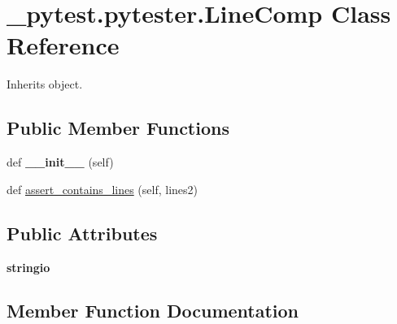 \hypertarget{class__pytest_1_1pytester_1_1_line_comp}{}\section{\+\_\+pytest.\+pytester.\+Line\+Comp Class Reference}
\label{class__pytest_1_1pytester_1_1_line_comp}


Inherits object.

\subsection*{Public Member Functions}
\begin{DoxyCompactItemize}
\item 
\mbox{\label{class__pytest_1_1pytester_1_1_line_comp_afca557bc4922ba67c3971ec4f550e587}} 
def {\bfseries \+\_\+\+\_\+init\+\_\+\+\_\+} (self)
\item 
def \hyperlink{class__pytest_1_1pytester_1_1_line_comp_a323d8292ed0ec82721e0654859929202}{assert\+\_\+contains\+\_\+lines} (self, lines2)
\end{DoxyCompactItemize}
\subsection*{Public Attributes}
\begin{DoxyCompactItemize}
\item 
\mbox{\label{class__pytest_1_1pytester_1_1_line_comp_a4fb2c2a3b772b76993148a6e5618ee96}} 
{\bfseries stringio}
\end{DoxyCompactItemize}


\subsection{Member Function Documentation}
\mbox{\label{class__pytest_1_1pytester_1_1_line_comp_a323d8292ed0ec82721e0654859929202}} 
